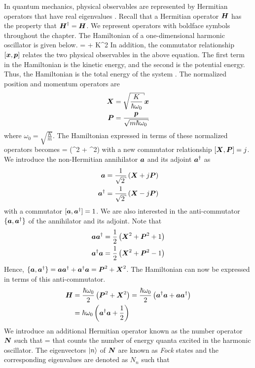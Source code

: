 In quantum mechanics, physical observables are represented by Hermitian operators that have real eigenvalues \cite{griffiths, linalg}. Recall that a Hermitian operator $\boldsymbol H$ has the property that $\boldsymbol H^\dagger = \boldsymbol H$. We represent operators with boldface symbols throughout the chapter. The Hamiltonian of a one-dimensional harmonic oscillator is given below.
\beq
\opH =  + K\opx^2
\eeq
In addition, the commutator relationship $[\boldsymbol x,\boldsymbol p]$ relates the two physical observables in the above equation. The first term in the Hamiltonian is the kinetic energy, and the second is the potential energy. Thus, the Hamiltonian is the total energy of the system \cite{griffiths}. The normalized position and momentum operators are
\begin{align}
\opX &= \sqrt{\frac{K}{\hbar\omega_0}}\opx\\
\opP &= \frac{\opp}{\sqrt{m\hbar\omega_0}}
\end{align}
where $\omega_0 = \sqrt{\frac{K}{m}}$. The Hamiltonian expressed in terms of these normalized operators becomes
\beq
\label{eq:hamiltonianxp}
\opH = \left(\opP^2 + \opX^2\right)
\eeq
with a new commutator relationship $[\boldsymbol X,\boldsymbol P] = j$. We introduce the non-Hermitian annihilator $\boldsymbol a$ and its adjoint $\boldsymbol a^{\dagger}$ as
\begin{align}
\label{eq:acdef}
\opa &= \frac{1}{\sqrt{2}}\left(\opX + j\opP\right)\\
\opaa &= \frac{1}{\sqrt{2}}\left(\opX - j\opP\right)
\end{align}
with a commutator $[\boldsymbol a,\boldsymbol a^{\dagger}]=1$. We are also interested in the anti-commutator $\{\boldsymbol a,\boldsymbol a^{\dagger}\}$ of the annihilator and its adjoint. Note that
\begin{align}
\boldsymbol a\boldsymbol a^{\dagger} &= \frac{1}{2}\left(\boldsymbol X^2+\boldsymbol P^2+1\right)\\
\boldsymbol a^{\dagger}\boldsymbol a &= \frac{1}{2}\left(\boldsymbol X^2+\boldsymbol P^2-1\right)
\end{align}
Hence, $\{\boldsymbol a,\boldsymbol a^{\dagger}\} = \boldsymbol a\boldsymbol a^{\dagger}+\boldsymbol a^{\dagger}\boldsymbol a = \boldsymbol P^2 + \boldsymbol X^2$. The Hamiltonian can now be expressed in terms of this anti-commutator.
\begin{align}
\boldsymbol H &= \frac{\hbar\omega_0}{2}\left(\boldsymbol P^2 + \boldsymbol X^2\right) = \frac{\hbar\omega_0}{2}\left(\boldsymbol a^{\dagger}\boldsymbol a + \boldsymbol a\boldsymbol a^{\dagger}\right)\\
&= \hbar\omega_0\left(\boldsymbol a^{\dagger}\boldsymbol a + \frac{1}{2}\right)
\end{align}
We introduce an additional Hermitian operator known as the number operator $\boldsymbol N$ such that
\beq
\opN = \opaa\opa
\eeq
that counts the number of energy quanta excited in the harmonic oscillator. The eigenvectors $|n\rangle$ of $\boldsymbol N$ are known as \textit{Fock} states and the corresponding eigenvalues are denoted as $N_n$ such that
